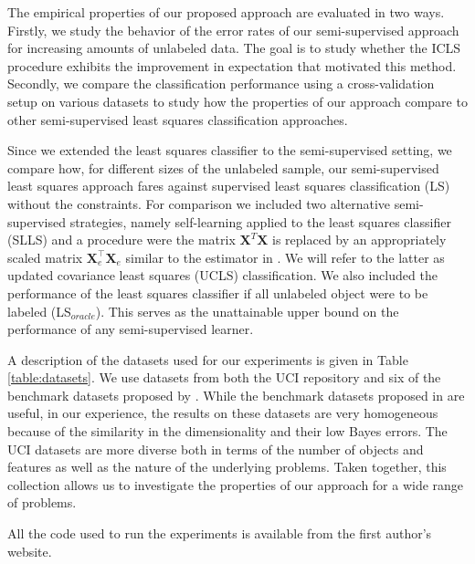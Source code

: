 \documentclass{llncs}
\newcommand{\Xe}{\mathbf{X}_e  }
\newcommand{\XeT}{\mathbf{X}_e^{\top}}
\begin{document}
The empirical properties of our proposed approach are evaluated in two ways. Firstly, we study the behavior of the error rates of our semi-supervised approach for increasing amounts of unlabeled data. The goal is to study whether the ICLS procedure exhibits the improvement in expectation that motivated this method. Secondly, we compare the classification performance using a cross-validation setup on various datasets to study how the properties of our approach compare to other semi-supervised least squares classification approaches.

Since we extended the least squares classifier to the semi-supervised setting, we compare how, for different sizes of the unlabeled sample,  our semi-supervised least squares approach fares against supervised least squares classification (LS) without the constraints. For comparison we included two alternative semi-supervised strategies, namely self-learning applied to the least squares classifier (SLLS) and a procedure were the matrix $\mathbf{X}^T \mathbf{X}$ is replaced by an appropriately scaled matrix $\XeT \Xe$ similar to the estimator in \cite{Shaffer1991}. We will refer to the latter as updated covariance least squares (UCLS) classification. We also included the performance of the least squares classifier if all unlabeled object were to be labeled (LS$_{oracle}$). This serves as the unattainable upper bound on the performance of any semi-supervised learner. 

A description of the datasets used for our experiments is given in Table \ref{table:datasets}. We use datasets from both the UCI repository \cite{Bache2013} and six of the benchmark datasets proposed by \cite{Chapelle2006}. While the benchmark datasets proposed in \cite{Chapelle2006} are useful, in our experience, the results on these datasets are very homogeneous because of the similarity in the dimensionality and their low Bayes errors. The UCI datasets are more diverse both in terms of the number of objects and features as well as the nature of the underlying problems. Taken together, this collection allows us to investigate the properties of our approach for a wide range of problems.

All the code used to run the experiments is available from the first author's website.
\end{document}

